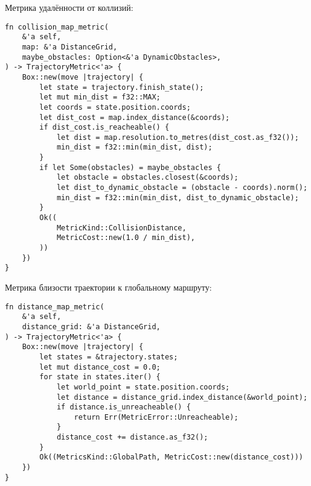 Метрика удалённости от коллизий:
\begin{lstlisting}
fn collision_map_metric(
    &'a self,
    map: &'a DistanceGrid,
    maybe_obstacles: Option<&'a DynamicObstacles>,
) -> TrajectoryMetric<'a> {
    Box::new(move |trajectory| {
        let state = trajectory.finish_state();
        let mut min_dist = f32::MAX;
        let coords = state.position.coords;
        let dist_cost = map.index_distance(&coords);
        if dist_cost.is_reacheable() {
            let dist = map.resolution.to_metres(dist_cost.as_f32());
            min_dist = f32::min(min_dist, dist);
        }
        if let Some(obstacles) = maybe_obstacles {
            let obstacle = obstacles.closest(&coords);
            let dist_to_dynamic_obstacle = (obstacle - coords).norm();
            min_dist = f32::min(min_dist, dist_to_dynamic_obstacle);
        }
        Ok((
            MetricKind::CollisionDistance,
            MetricCost::new(1.0 / min_dist),
        ))
    })
}
\end{lstlisting}

Метрика близости траектории к глобальному маршруту:
\begin{lstlisting}
fn distance_map_metric(
    &'a self,
    distance_grid: &'a DistanceGrid,
) -> TrajectoryMetric<'a> {
    Box::new(move |trajectory| {
        let states = &trajectory.states;
        let mut distance_cost = 0.0;
        for state in states.iter() {
            let world_point = state.position.coords;
            let distance = distance_grid.index_distance(&world_point);
            if distance.is_unreacheable() {
                return Err(MetricError::Unreacheable);
            }
            distance_cost += distance.as_f32();
        }
        Ok((MetricsKind::GlobalPath, MetricCost::new(distance_cost)))
    })
}
\end{lstlisting}




